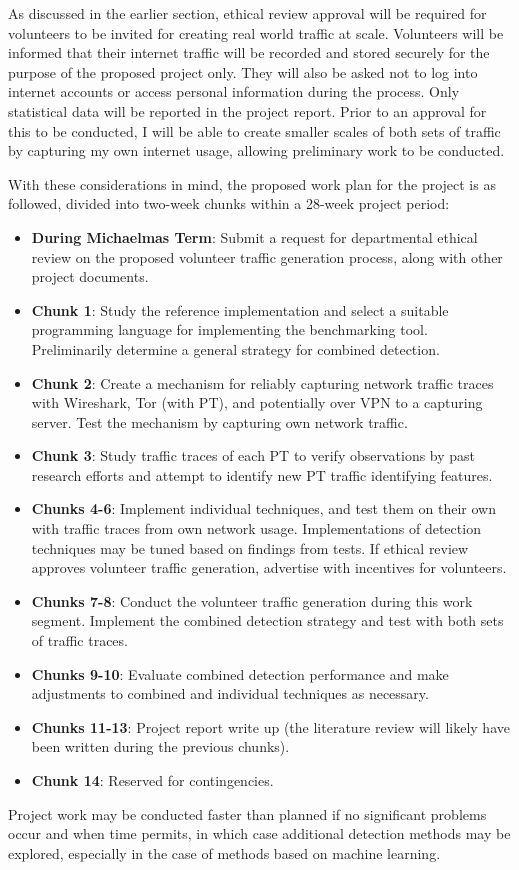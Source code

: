 \documentclass[11pt]{article}
\begin{document}
As discussed in the earlier section, ethical review approval will be required for volunteers to be invited for creating real world traffic at scale. Volunteers will be informed that their internet traffic will be recorded and stored securely for the purpose of the proposed project only. They will also be asked not to log into internet accounts or access personal information during the process. Only statistical data will be reported in the project report. Prior to an approval for this to be conducted, I will be able to create smaller scales of both sets of traffic by capturing my own internet usage, allowing preliminary work to be conducted. 

With these considerations in mind, the proposed work plan for the project is as followed, divided into two-week chunks within a 28-week project period:

\begin{itemize}
	\item \textbf{During Michaelmas Term}: Submit a request for departmental ethical review on the proposed volunteer traffic generation process, along with other project documents.
	\item \textbf{Chunk 1}: Study the reference implementation and select a suitable programming language for implementing the benchmarking tool. Preliminarily determine a general strategy for combined detection.
	\item \textbf{Chunk 2}: Create a mechanism for reliably capturing network traffic traces with Wireshark, Tor (with PT), and potentially over VPN to a capturing server. Test the mechanism by capturing own network traffic.
	\item \textbf{Chunk 3}: Study traffic traces of each PT to verify observations by past research efforts and attempt to identify new PT traffic identifying features.
	\item \textbf{Chunks 4-6}: Implement individual techniques, and test them on their own with traffic traces from own network usage. Implementations of detection techniques may be tuned based on findings from tests.  If ethical review approves volunteer traffic generation, advertise with incentives for volunteers.
	\item \textbf{Chunks 7-8}: Conduct the volunteer traffic generation during this work segment. Implement the combined detection strategy and test with both sets of traffic traces. 
	\item \textbf{Chunks 9-10}: Evaluate combined detection performance and make adjustments to combined and individual techniques as necessary.
	\item \textbf{Chunks 11-13}: Project report write up (the literature review will likely have been written during the previous chunks).
	\item \textbf{Chunk 14}: Reserved for contingencies.
\end{itemize}

Project work may be conducted faster than planned if no significant problems occur and when time permits, in which case additional detection methods may be explored, especially in the case of methods based on machine learning.


\footnotesize{}
\end{document}
